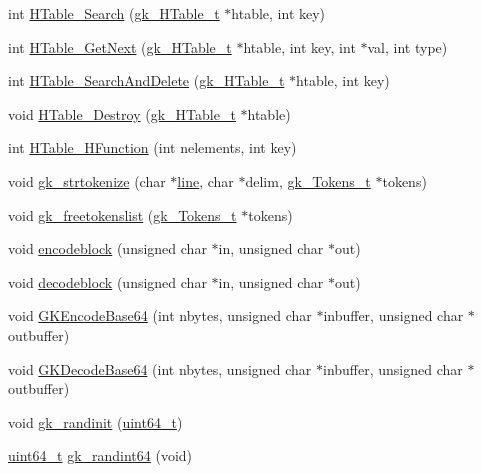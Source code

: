 \begin{DoxyCompactItemize}
\item 
int \hyperlink{a00077_a2b610fbd6017e0ef2e393c563b4809a5}{H\+Table\+\_\+\+Search} (\hyperlink{a00650}{gk\+\_\+\+H\+Table\+\_\+t} $\ast$htable, int key)
\item 
int \hyperlink{a00077_a06dc1c772847749d0af6be1ba7328e4e}{H\+Table\+\_\+\+Get\+Next} (\hyperlink{a00650}{gk\+\_\+\+H\+Table\+\_\+t} $\ast$htable, int key, int $\ast$val, int type)
\item 
int \hyperlink{a00077_acb372a5e2569817f3a10cbeababda100}{H\+Table\+\_\+\+Search\+And\+Delete} (\hyperlink{a00650}{gk\+\_\+\+H\+Table\+\_\+t} $\ast$htable, int key)
\item 
void \hyperlink{a00077_a4552b6bc8e0b509913638222daecf3aa}{H\+Table\+\_\+\+Destroy} (\hyperlink{a00650}{gk\+\_\+\+H\+Table\+\_\+t} $\ast$htable)
\item 
int \hyperlink{a00077_afe255e126a6c4eec5efb11c3691b3155}{H\+Table\+\_\+\+H\+Function} (int nelements, int key)
\item 
void \hyperlink{a00077_a10256e3a692ac19ff5056d1dc413bd29}{gk\+\_\+strtokenize} (char $\ast$\hyperlink{a00608_a1d1b0d42391bd99b4214d9216b163807}{line}, char $\ast$delim, \hyperlink{a00654}{gk\+\_\+\+Tokens\+\_\+t} $\ast$tokens)
\item 
void \hyperlink{a00077_a721067a5b35f35422d141ad8652021ec}{gk\+\_\+freetokenslist} (\hyperlink{a00654}{gk\+\_\+\+Tokens\+\_\+t} $\ast$tokens)
\item 
void \hyperlink{a00077_a9196de4bd8fefa1d09e0d4a273dedde5}{encodeblock} (unsigned char $\ast$in, unsigned char $\ast$out)
\item 
void \hyperlink{a00077_a16b79810a7cfac6a5bc729e7bea80f7b}{decodeblock} (unsigned char $\ast$in, unsigned char $\ast$out)
\item 
void \hyperlink{a00077_a63253b29fd38d41463013481ce7e7f0a}{G\+K\+Encode\+Base64} (int nbytes, unsigned char $\ast$inbuffer, unsigned char $\ast$outbuffer)
\item 
void \hyperlink{a00077_a489bc1aa604dc1c8bc1fcb4e404de26a}{G\+K\+Decode\+Base64} (int nbytes, unsigned char $\ast$inbuffer, unsigned char $\ast$outbuffer)
\item 
void \hyperlink{a00077_a6a9fc2e9810099e03edc40607a7ea8aa}{gk\+\_\+randinit} (\hyperlink{a00119_aec6fcb673ff035718c238c8c9d544c47}{uint64\+\_\+t})
\item 
\hyperlink{a00119_aec6fcb673ff035718c238c8c9d544c47}{uint64\+\_\+t} \hyperlink{a00077_a2a2322fc19f0dfd85b92cf6325c743a2}{gk\+\_\+randint64} (void)
\item 

\end{DoxyCompactItemize}
